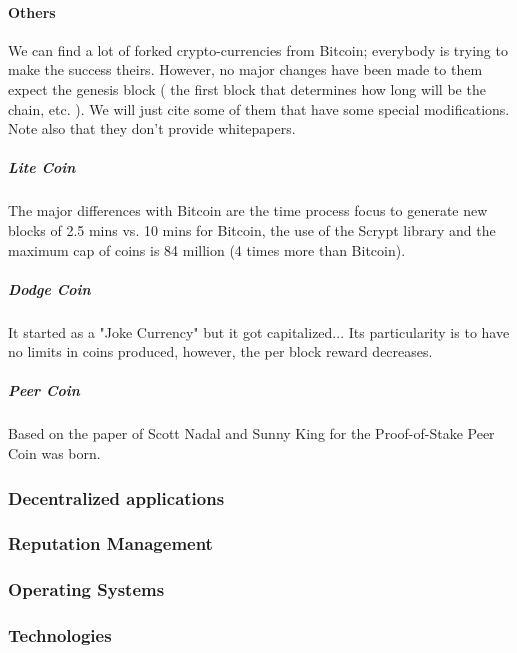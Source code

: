 \paragraph{Others}
We can find a lot of forked crypto-currencies from Bitcoin; everybody is trying to make the success theirs. However, no major changes have been made to them expect the genesis block ( the first block that determines how long will be the chain, etc. ). We will just cite some of them that have some special modifications. Note also that they don't provide whitepapers.

\subparagraph{Lite Coin\cite{Litecoin2011LitecoinWiki}}
The major differences with Bitcoin are the time process focus to generate new blocks of 2.5 mins vs. 10 mins for Bitcoin, the use of the Scrypt\cite{COLINPERCIVAL2012STRONGERFUNCTIONS} library and the maximum cap of coins is 84 million (4 times more than Bitcoin).

\subparagraph{Dodge Coin \cite{MaxK.2013DogecoinCore}}
It started as a "Joke Currency" but it got capitalized... Its particularity is to have no limits in coins produced, however, the per block reward decreases. 

\subparagraph{Peer Coin \cite{King2012Peercoin}}
Based on the paper of Scott Nadal and Sunny King \cite{King2012PPCoin:Proof-of-Stake} for the Proof-of-Stake Peer Coin was born.

\subsubsection{Decentralized applications}

\subsubsection{Reputation Management}

\subsubsection{Operating Systems}

\subsubsection{Technologies}

